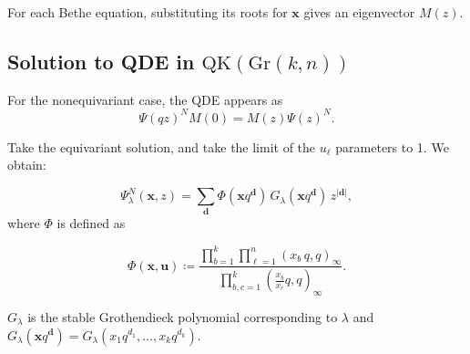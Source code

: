 \documentclass[12pt]{article}
\theoremstyle{plain}
\theoremstyle{definition}
\newcommand{\xb}{\boldsymbol{x}}
\newcommand{\db}{\boldsymbol{d}}
\newcommand{\ub}{\boldsymbol{u}}
\begin{document}
For each Bethe equation, substituting its roots for $\xb $ gives an eigenvector $M(z)$.


\subsection{Solution to QDE in \texorpdfstring{$\textrm{QK}(\textrm{Gr}(k,n))$}{QK}}

For the nonequivariant case, the QDE appears as 
\begin{equation}
    \Psi(qz)^{N} M(0) = M(z) \Psi(z)^{N}.
\end{equation}

Take the equivariant solution, and take the limit of the $u_\ell$ parameters to 1. We obtain:

\begin{equation}
     \Psi^N_\lambda(\xb ,z)
    =\sum_{\db} \Phi(\xb q^{\boldsymbol{d}})\, G_{\lambda} \left( \xb q^{\boldsymbol{d}}\right)\, z^{|\boldsymbol{d}|}, 
\end{equation}
where  $\Phi$ is defined as

$$\Phi(\xb ,\ub)\coloneq\frac{\prod\limits_{b=1}^k \prod\limits_
    {\ell=1}^n \left({x_b \, }q,q\right)_\infty}{\prod\limits_{b,c=1}^k \left(\frac{x_b }{x_c }q,q\right)_\infty} .$$


$G_\lambda$ is the stable Grothendieck polynomial   corresponding to $\lambda$ and\\ $G_\lambda(\xb q^{\boldsymbol{d}}  )=G_\lambda (x_1q^{d_1},\dots, x_kq^{d_k} )$. 



\end{document}
